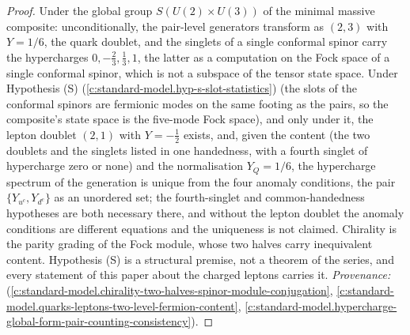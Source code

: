 \documentclass[11pt]{article}
\theoremstyle{definition}
\theoremstyle{plain}
\begin{document}
\begin{proof}
Under the global group $S(U(2) \times U(3))$ of the minimal massive composite: unconditionally, the pair-level generators transform as $(2,3)$ with $Y = 1/6$, the quark doublet, and the singlets of a single conformal spinor carry the hypercharges $0, -\tfrac23, \tfrac13, 1$, the latter as a computation on the Fock space of a single conformal spinor, which is not a subspace of the tensor state space. Under Hypothesis (S) (\ref{c:standard-model.hyp-s-slot-statistics}) (the slots of the conformal spinors are fermionic modes on the same footing as the pairs, so the composite's state space is the five-mode Fock space), and only under it, the lepton doublet $(2,1)$ with $Y = -\tfrac12$ exists, and, given the content (the two doublets and the singlets listed in one handedness, with a fourth singlet of hypercharge zero or none) and the normalisation $Y_{Q} = 1/6$, the hypercharge spectrum of the generation is unique from the four anomaly conditions, the pair $\{Y_{u^{c}}, Y_{d^{c}}\}$ as an unordered set; the fourth-singlet and common-handedness hypotheses are both necessary there, and without the lepton doublet the anomaly conditions are different equations and the uniqueness is not claimed. Chirality is the parity grading of the Fock module, whose two halves carry inequivalent content. Hypothesis (S) is a structural premise, not a theorem of the series, and every statement of this paper about the charged leptons carries it. \emph{Provenance:} \cite[\S4-\S5, in particular Prop.~5.3, Thm.~5.5, Prop.~5.6]{ButlerT12} (\ref{c:standard-model.chirality-two-halves-spinor-module-conjugation}, \ref{c:standard-model.quarks-leptons-two-level-fermion-content}, \ref{c:standard-model.hypercharge-global-form-pair-counting-consistency}).

\end{proof}
\end{document}
